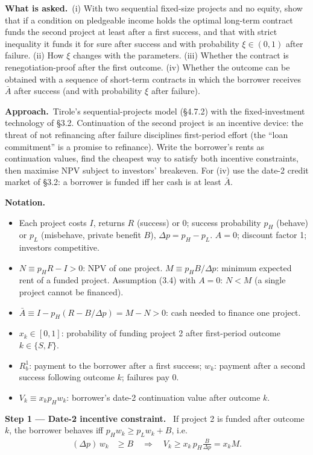 \documentclass[11pt,a4paper]{article}
\newcommand{\notation}{\par\noindent\textbf{Notation.}}
\newcommand{\step}[2]{\par\medskip\noindent\textbf{Step #1 --- #2.}~}
\newcommand{\asked}{\par\medskip\noindent\textbf{What is asked.}~}
\newcommand{\approach}{\par\smallskip\noindent\textbf{Approach.}~}
\begin{document}
\asked (i) With two sequential fixed-size projects and no equity, show that if a condition on pledgeable income holds the optimal long-term contract funds the second project at least after a first success, and that with strict inequality it funds it for sure after success and with probability $\xi\in(0,1)$ after failure. (ii) How $\xi$ changes with the parameters. (iii) Whether the contract is renegotiation-proof after the first outcome. (iv) Whether the outcome can be obtained with a sequence of short-term contracts in which the borrower receives $\bar A$ after success (and with probability $\xi$ after failure).

\approach Tirole's sequential-projects model (\S 4.7.2) with the fixed-investment technology of \S 3.2. Continuation of the second project is an incentive device: the threat of not refinancing after failure disciplines first-period effort (the ``loan commitment'' is a promise to refinance). Write the borrower's rents as continuation values, find the cheapest way to satisfy both incentive constraints, then maximise NPV subject to investors' breakeven. For (iv) use the date-2 credit market of \S 3.2: a borrower is funded iff her cash is at least $\bar A$.

\notation
\begin{itemize}
  \item Each project costs $I$, returns $R$ (success) or 0; success probability $p_H$ (behave) or $p_L$ (misbehave, private benefit $B$), $\Delta p=p_H-p_L$. $A=0$; discount factor 1; investors competitive.
  \item $N\equiv p_HR-I>0$: NPV of one project. $M\equiv p_HB/\Delta p$: minimum expected rent of a funded project. Assumption (3.4) with $A=0$: $N<M$ (a single project cannot be financed).
  \item $\bar A\equiv I-p_H(R-B/\Delta p)=M-N>0$: cash needed to finance one project.
  \item $x_k\in[0,1]$: probability of funding project 2 after first-period outcome $k\in\{S,F\}$.
  \item $R_b^1$: payment to the borrower after a first success; $w_k$: payment after a second success following outcome $k$; failures pay 0.
  \item $V_k\equiv x_kp_Hw_k$: borrower's date-2 continuation value after outcome $k$.
\end{itemize}

\step{1}{Date-2 incentive constraint} If project 2 is funded after outcome $k$, the borrower behaves iff $p_Hw_k\ge p_Lw_k+B$, i.e.
\begin{align}
  (\Delta p)\,w_k &\ge B \quad\Longrightarrow\quad V_k \ge x_k\,p_H\frac{B}{\Delta p}=x_kM. \label{r6e6-ic2}
\end{align}
\end{document}
